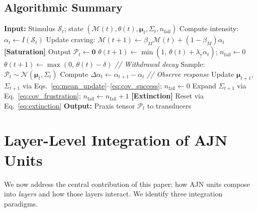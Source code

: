 \documentclass[12pt,a4paper]{article}
\begin{document}
\subsection{Algorithmic Summary}

\begin{algorithm}[H]
\caption{Extended AJN Processing Cycle (single unit)}
\begin{algorithmic}[1]
\STATE \textbf{Input:} Stimulus $\mathcal{S}_t$; state
       $(\mathcal{M}(t), \theta(t), \boldsymbol{\mu}_t, \Sigma_t, n_{\text{fail}})$
\STATE Compute intensity: $\alpha_t \leftarrow I(\mathcal{S}_t)$
\STATE Update craving: $\mathcal{M}(t{+}1) \leftarrow
       \beta_M \mathcal{M}(t) + (1{-}\beta_M)\alpha_t$
    \STATE \textbf{[Saturation]} Output $\mathcal{P}_t \leftarrow \mathbf{0}$
    \STATE $\theta(t{+}1) \leftarrow \min(1,\, \theta(t) + \lambda_\uparrow \alpha_t)$;
           $n_{\text{fail}} \leftarrow 0$
\ELSE
    \STATE $\theta(t{+}1) \leftarrow \max(0,\, \theta(t) - \delta)$
           \hfill \textit{// Withdrawal decay}
    \STATE Sample: $\mathcal{P}_t \sim \mathcal{N}(\boldsymbol{\mu}_t, \Sigma_t)$
    \STATE Compute $\Delta\alpha_t \leftarrow \alpha_{t+1} - \alpha_t$
           \hfill \textit{// Observe response}
        \STATE Update $\boldsymbol{\mu}_{t+1}$, $\Sigma_{t+1}$ via
               Eqs.~\eqref{eq:mean_update}--\eqref{eq:cov_success};
               $n_{\text{fail}} \leftarrow 0$
    \ELSE
        \STATE Expand $\Sigma_{t+1}$ via Eq.~\eqref{eq:cov_frustration};
               $n_{\text{fail}} \leftarrow n_{\text{fail}} + 1$
            \STATE \textbf{[Extinction]} Reset via Eq.~\eqref{eq:extinction}
        \ENDIF
    \ENDIF
\ENDIF
\STATE \textbf{Output:} Praxis tensor $\mathcal{P}_t$ to transducers
\end{algorithmic}
\end{algorithm}

\section{Layer-Level Integration of AJN Units}
\label{sec:layer_integration}

We now address the central contribution of this paper: how AJN units compose into
\textit{layers} and how those layers interact. We identify three integration paradigms.
\end{document}
